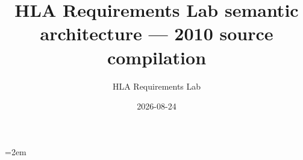 \documentclass[10pt,oneside]{article}
\title{HLA Requirements Lab semantic architecture --- 2010 source compilation}
\author{HLA Requirements Lab}
\date{2026-08-24}
\begin{document}
    
    \tableofcontents
    \clearpage
    \RaggedRight
    \emergencystretch=2em
    
\end{document}
